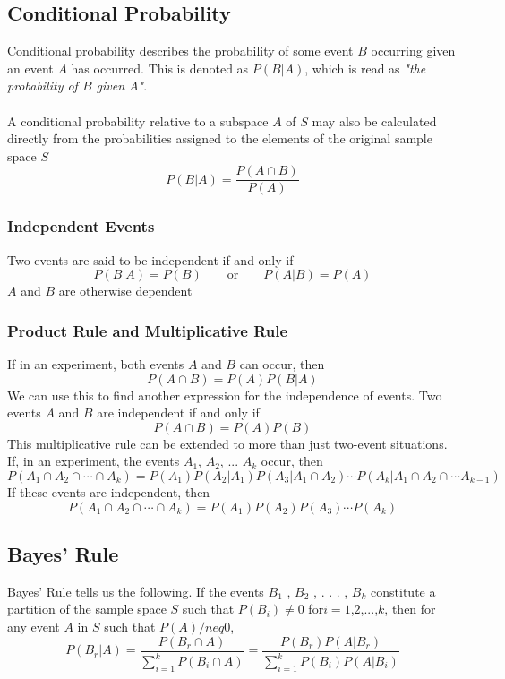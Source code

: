 \documentclass[11pt]{article}
\begin{document}
\subsection{Conditional Probability}
Conditional probability describes the probability of some event $B$ occurring given an event $A$ has occurred. This is denoted as $P(B|A)$, which is read as \textit{"the probability of $B$ given $A$"}. \\ \\ A conditional probability relative to a subspace $A$ of $S$ may also be calculated directly from the probabilities assigned to the elements of the original sample space $S$
$$ P(B|A) = \frac{P(A \cap B)}{P(A)}$$

\subsubsection{Independent Events}
Two events are said to be independent if and only if 
$$P(B|A) = P(B) \quad \quad \text{or} \quad  \quad P(A|B) = P(A)$$
$A$ and $B$ are otherwise dependent

\subsubsection{Product Rule and Multiplicative Rule}
If in an experiment, both events $A$ and $B$ can occur, then 
$$ P(A \cap B) = P(A)P(B|A)$$
We can use this to find another expression for the independence of events. Two events $A$ and $B$ are independent if and only if 
$$ P(A \cap B) = P(A)P(B)$$
This multiplicative rule can be extended to more than just two-event situations. If, in an experiment, the events $A_1$, $A_2$, ... $A_k$ occur, then
$$ P(A_1 \cap A_2 \cap \cdots \cap A_k) = P(A_1)P(A_2|A_1)P(A_3|A_1 \cap A_2) \cdots P(A_k| A_1 \cap A_2 \cap \cdots A_{k-1})$$ If these events are independent, then 
$$ P(A_1 \cap A_2 \cap \cdots \cap A_k) = P(A_1)P(A_2)P(A_3) \cdots P(A_k)$$

\subsection{Bayes' Rule}
Bayes' Rule tells us the following. If the events $B_1$ , $B_2$ , . . . , $B_k$ constitute a partition of the sample space $S$ such that $P(B_i) \neq 0$ for$ i = 1$,$2$,$...$,$k$, then for any event $A$ in $S$ such that $P(A) /neq 0$,
$$ P(B_r | A) = \frac{P(B_r \cap A)}{\sum_{i=1}^{k} P(B_i \cap A) } = \frac{P(B_r) P(A | B_r)}{\sum_{i=1}^{k} P(B_i)P(A|B_i) }$$
\end{document}
